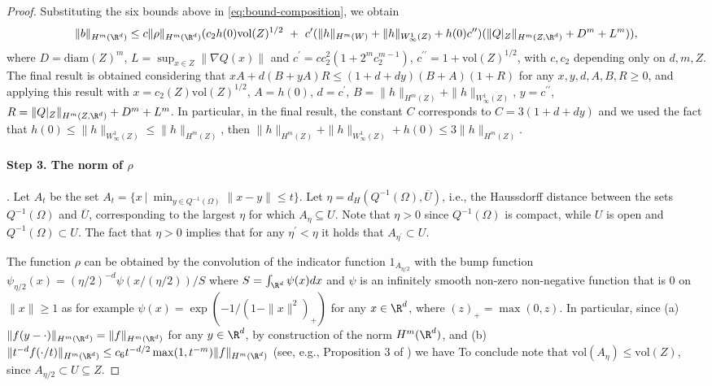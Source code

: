 \begin{proof}
{}
Substituting the six bounds above in \cref{eq:bound-composition}, we obtain
$$
\|b\|_{H^m(\R^d)} \leq c \|\rho\|_{H^m(\R^d)}(c_2 h(0) \textrm{vol}(Z)^{1/2} ~+~ c^\prime ( \|h\|_{H^m(W)} + \|h\|_{W^1_\infty(Z)} + h(0) c^{\prime\prime})(\|Q|_Z\|_{H^m(Z, \R^d)} + D^m + L^m)),
$$
where $D =\textrm{diam}(Z)^m $, $L = \sup_{x \in Z} \|\nabla Q (x)\|$ and $c^\prime = c c_2^2 (1 + 2^m c_2^{m-1})$, $c^{\prime\prime}=1+\textrm{vol}(Z)^{1/2}$, with $c, c_2$ depending only on $d, m, Z$.
The final result is obtained considering that $x A + d (B + y A) R \leq (1+ d + d y)(B+A)(1+R)$ for any $x,y,d,A,B, R \geq 0$, and applying this result with $x=c_2(Z)\textrm{vol}(Z)^{1/2}$, $A = h(0)$, $d = c^\prime$, $B = \|h\|_{H^m(Z)} + \|h\|_{W^1_\infty(Z)}$, $y= c^{\prime \prime}$, $R = \|Q|_Z\|_{H^m(Z, \R^d)} + D^m + L^m$. In particular, in the final result, the constant $C$ corresponds to $C = 3(1+ d + d y)$ and we used the fact that $h(0) \leq \|h\|_{W^1_\infty(Z)} \leq \|h\|_{H^m(Z)}$, then $\|h\|_{H^m(Z)} + \|h\|_{W^1_\infty(Z)} + h(0) \leq 3 \|h\|_{H^m(Z)}$.


\paragraph{Step 3. The norm of $\rho$}.  Let $A_{t}$ be the set $A_{t} = \{x ~|~ \min_{y \in Q^{-1}(\Omega)} \|x-y\| \leq t\}$. Let $\eta = d_H(Q^{-1}(\Omega), \overline{U})$, i.e., the Haussdorff distance between the sets $Q^{-1}(\Omega)$ and $\overline{U}$, corresponding to the largest $\eta$ for which $A_\eta \subseteq U$. Note that $\eta > 0$ since $Q^{-1}(\Omega)$ is compact, while $U$ is open and $Q^{-1}(\Omega) \subset U$. The fact that $\eta > 0$ implies that for any $\eta^\prime < \eta$ it holds that $A_{\eta^\prime} \subset U$.

The function $\rho$ can be obtained by the convolution of the indicator function $1_{A_{\eta/2}}$ with the bump function $\psi_{\eta/2}(x) =  (\eta/2)^{-d} \psi(x/(\eta/2))/S$ where $S = \int_{\R^d} \psi(x) dx$ and $\psi$ is an infinitely smooth non-zero non-negative function that is $0$ on $\|x\| \geq 1$ as for example $\psi(x) = \exp(-1/(1-\|x\|^2)_+)$ for any $x \in \R^d$, where $(z)_+ = \max(0,z)$. In particular, since (a) $\|f(y-\cdot)\|_{H^m(\R^d)} = \|f\|_{H^m(\R^d)}$ for any $y \in \R^d$, by construction of the norm $H^m(\R^d)$, and (b) $\|t^{-d} f(\cdot/t)\|_{H^m(\R^d)} \leq c_6 t^{-d/2} \max(1,t^{-m}) \|f\|_{H^m(\R^d)}$ (see, e.g., Proposition 3 of \citealp{runst2011sobolev}) we have
To conclude note that $\textrm{vol}(A_\eta) \leq \textrm{vol}(Z)$, since $A_{\eta/2} \subset U \subseteq Z$.
\end{proof}


